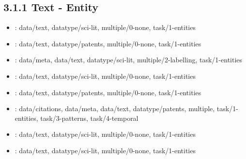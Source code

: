 \begin {refsection}
\section [3.1.1 Text - Entity] {3.1.1 Text - Entity}

\begin {itemize}
\item \cite {olsen-1993-visualization-of-a-document-collection:-the-vibe-system}:
    data/text, datatype/sci-lit, multiple/0-none, task/1-entities


\item \cite {hearst-1995-tilebars:-visualization-of-term-distribution-information}:
    data/text, datatype/patents, multiple/0-none, task/1-entities


\item \cite {strobelt-2009-document-cards:-a-top-trumps-visualization-for-documents}:
    data/meta, data/text, datatype/sci-lit, multiple/2-labelling, task/1-entities


\item \cite {costagliola-2011-cybis:-a-novel-interface-for-searching-scientific}:
    data/text, datatype/sci-lit, multiple/0-none, task/1-entities


\item \cite {havre-2001-interactive-visualization-of-multiple-query-results}:
    data/text, datatype/patents, multiple/0-none, task/1-entities


\item \cite {koch-2011-iterative-integration-of-visual-insights-during}:
    data/citations, data/meta, data/text, datatype/patents, multiple, task/1-entities, task/3-patterns, task/4-temporal


\item \cite {korfhage-1991-to-see-or-not-to-see----is-that-the-query}:
    data/text, datatype/sci-lit, multiple/0-none, task/1-entities


\item \cite {nowell-1996-visualizing-search-results:-some-alternatives}:
    data/text, datatype/sci-lit, multiple/0-none, task/1-entities


\end {itemize}
\printbibliography
\end {refsection}\pagebreak

